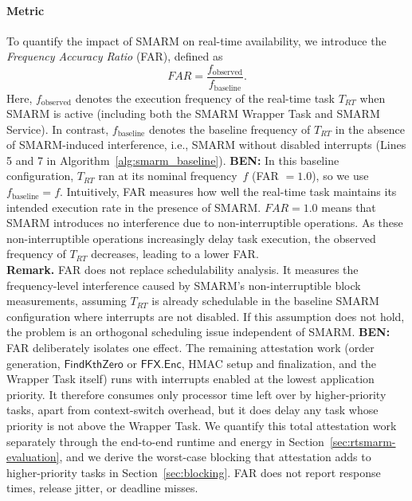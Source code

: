 \documentclass{ieeeaccess}
\DeclareRobustCommand{\ben}[1]{{\color{BENcolor}\textbf{BEN:} #1}}
\begin{document}
\paragraph{\textbf{Metric}}
To quantify the impact of SMARM on real-time availability, we 
introduce the \emph{Frequency Accuracy Ratio} (FAR), defined as
\begin{equation}
    FAR = \frac{f_{\text{observed}}}{f_{\text{baseline}}}.
\end{equation}
Here, $f_{\text{observed}}$ denotes the execution frequency of 
the real-time task $T_{RT}$ when SMARM is active (including both 
the SMARM Wrapper Task and SMARM Service).
In contrast, $f_{\text{baseline}}$ denotes the baseline frequency 
of $T_{RT}$ in the absence of SMARM-induced interference, i.e., 
SMARM without disabled interrupts (Lines 5 and 7 in 
Algorithm~\ref{alg:smarm_baseline}).
\ben{In this baseline configuration, $T_{RT}$ ran at its nominal frequency~$f$ (FAR $= 1.0$), so we use $f_{\text{baseline}} = f$.}
Intuitively, FAR measures how well the real-time task maintains 
its intended execution rate in the presence of SMARM.
$FAR = 1.0$ means that SMARM introduces no interference due to 
non-interruptible operations.
As these non-interruptible operations increasingly delay task 
execution, the observed frequency of $T_{RT}$ decreases, leading to a lower FAR.~\\


\noindent\textbf{Remark.}
FAR does not replace schedulability analysis.
It measures the frequency-level interference caused by SMARM's non-interruptible block measurements, assuming $T_{RT}$ is already schedulable in the baseline SMARM configuration where interrupts are not disabled.
If this assumption does not hold, the problem is an orthogonal scheduling issue independent of SMARM.
\ben{FAR deliberately isolates one effect.
The remaining attestation work (order generation, $\mathsf{FindKthZero}$ or $\mathsf{FFX.Enc}$, HMAC setup and finalization, and the Wrapper Task itself) runs with interrupts enabled at the lowest application priority.
It therefore consumes only processor time left over by higher-priority tasks, apart from context-switch overhead, but it does delay any task whose priority is not above the Wrapper Task.
We quantify this total attestation work separately through the end-to-end runtime and energy in Section~\ref{sec:rtsmarm-evaluation}, and we derive the worst-case blocking that attestation adds to higher-priority tasks in Section~\ref{sec:blocking}.
FAR does not report response times, release jitter, or deadline misses.}
\end{document}
